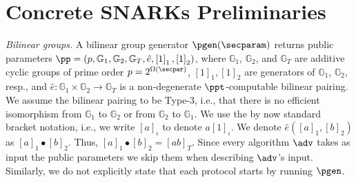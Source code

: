 \documentclass[10pt]{llncs}
\let\spvec\vec
\let\vec\accentvec
\let\spvec\vec
\let\vec\spvec
\def\vec#1{\mathchoice{\mbox{\boldmath$\displaystyle#1$}}
  {\mbox{\boldmath$\textstyle#1$}} {\mbox{\boldmath$\scriptstyle#1$}}
  {\mbox{\boldmath$\scriptscriptstyle#1$}}}
\newcommand{\GRP} {\mathbb{G}}
\newcommand{\pair} {\hat{e}}
\newcommand{\bmap}[2] {\left[#1\right]_{#2}}
\newcommand{\gone}[1] {\bmap{#1}{1}}
\newcommand{\gtwo}[1] {\bmap{#1}{2}}
\newcommand{\gi} {\iota}
\newcommand{\gtar}[1] {\bmap{#1}{T}}
\newcommand{\grpgi}[1] {\bmap{#1}{\gi}}
\DeclareRobustCommand{\markulf}[2] {}%
\DeclareRobustCommand{\michals}[2] {} %
\newcommand{\hamid}[2] {} %
\newcommand{\ourpar}[1] {\smallskip\noindent\emph{#1}}
\begin{document}


%




\section{Concrete SNARKs Preliminaries}

\ourpar{Bilinear groups.}
A bilinear group generator $\pgen (\secparam)$ returns public parameters $ \pp =
(p, \GRP_1, \GRP_2, \GRP_T, \pair, \gone{1}, \gtwo{1})$, where $\GRP_1$,
$\GRP_2$, and $\GRP_T$ are additive cyclic groups of prime order $p = 2^{\Omega
	(\secpar)}$, $\gone{1}, \gtwo{1}$ are generators of $\GRP_1$, $\GRP_2$, resp.,
and $\pair: \GRP_1 \times \GRP_2 \to \GRP_T$ is a non-degenerate
$\ppt$-computable bilinear pairing. We assume the bilinear pairing to be Type-3,
i.e., that there is no efficient isomorphism from $\GRP_1$ to $\GRP_2$ or from
$\GRP_2$ to $\GRP_1$. We use the by now standard bracket notation, i.e., we
write $\bmap{a}{\gi}$ to denote $a \bmap{1}{\gi}$. %
We denote $\pair (\gone{a}, \gtwo{b})$ as $\gone{a} \bullet
\gtwo{b}$. Thus, $\gone{a} \bullet \gtwo{b} = \gtar{a b}$. 
Since every algorithm $\adv$ takes as input
the public parameters we skip them when describing $\adv$'s input. Similarly, we
do not explicitly state that each protocol starts by running $\pgen$.
\end{document}

